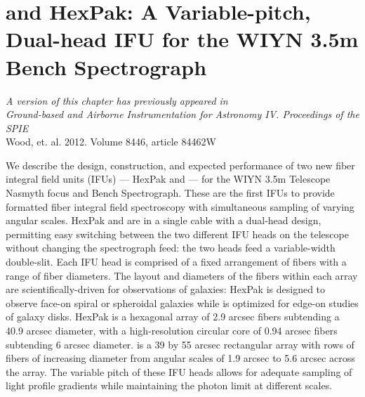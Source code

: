 \chapter[\GP Construction]{\GP and HexPak: A Variable-pitch, Dual-head IFU for the WIYN 3.5m Bench Spectrograph}
\label{chap:pak_build}


\vfill

\begin{flushright}
  \fixspacing
  \textit{A version of this chapter has previously appeared in\\
    \emph{Ground-based and Airborne Instrumentation for Astronomy IV. Proceedings of the SPIE}}\\
    \vspace{1ex}
    Wood, et. al. 2012. Volume 8446, article 84462W
\end{flushright}

\begin{chabstract}
  We describe the design, construction, and expected performance of two new
  fiber integral field units (IFUs) --- HexPak and \GP --- for the WIYN 3.5m
  Telescope Nasmyth focus and Bench Spectrograph.  These are the first IFUs to
  provide formatted fiber integral field spectroscopy with simultaneous sampling
  of varying angular scales.  HexPak and \GP are in a single cable with a
  dual-head design, permitting easy switching between the two different IFU
  heads on the telescope without changing the spectrograph feed: the two heads
  feed a variable-width double-slit.  Each IFU head is comprised of a fixed
  arrangement of fibers with a range of fiber diameters.  The layout and
  diameters of the fibers within each array are scientifically-driven for
  observations of galaxies: HexPak is designed to observe face-on spiral or
  spheroidal galaxies while \GP is optimized for edge-on studies of galaxy
  disks.  HexPak is a hexagonal array of 2.9 arcsec fibers subtending a 40.9
  arcsec diameter, with a high-resolution circular core of 0.94 arcsec fibers
  subtending 6 arcsec diameter.  \GP is a 39 by 55 arcsec rectangular array
  with rows of fibers of increasing diameter from angular scales of 1.9 arcsec
  to 5.6 arcsec across the array.  The variable pitch of these IFU heads allows
  for adequate sampling of light profile gradients while maintaining the photon
  limit at different scales.
\end{chabstract}
\cleardoublepage

